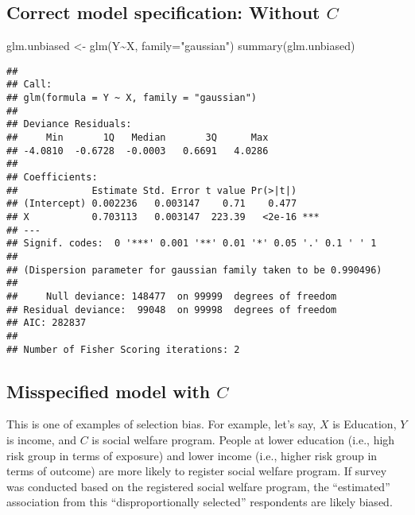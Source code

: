 \documentclass[
]{book}
\newenvironment{Shaded}{\begin{snugshade}}{\end{snugshade}}
\newcommand{\AttributeTok}[1]{\textcolor[rgb]{0.77,0.63,0.00}{#1}}
\newcommand{\FunctionTok}[1]{\textcolor[rgb]{0.00,0.00,0.00}{#1}}
\newcommand{\NormalTok}[1]{#1}
\newcommand{\OtherTok}[1]{\textcolor[rgb]{0.56,0.35,0.01}{#1}}
\newcommand{\SpecialCharTok}[1]{\textcolor[rgb]{0.00,0.00,0.00}{#1}}
\newcommand{\StringTok}[1]{\textcolor[rgb]{0.31,0.60,0.02}{#1}}
\begin{document}
\hypertarget{correct-model-specification-without-c-1}{%
\subsection{\texorpdfstring{Correct model specification: Without \(C\)}{Correct model specification: Without C}}\label{correct-model-specification-without-c-1}}

\begin{Shaded}
\begin{Highlighting}[]
\NormalTok{glm.unbiased }\OtherTok{\textless{}{-}} \FunctionTok{glm}\NormalTok{(Y}\SpecialCharTok{\textasciitilde{}}\NormalTok{X, }\AttributeTok{family=}\StringTok{"gaussian"}\NormalTok{)}
\FunctionTok{summary}\NormalTok{(glm.unbiased)}
\end{Highlighting}
\end{Shaded}

\begin{verbatim}
## 
## Call:
## glm(formula = Y ~ X, family = "gaussian")
## 
## Deviance Residuals: 
##     Min       1Q   Median       3Q      Max  
## -4.0810  -0.6728  -0.0003   0.6691   4.0286  
## 
## Coefficients:
##             Estimate Std. Error t value Pr(>|t|)    
## (Intercept) 0.002236   0.003147    0.71    0.477    
## X           0.703113   0.003147  223.39   <2e-16 ***
## ---
## Signif. codes:  0 '***' 0.001 '**' 0.01 '*' 0.05 '.' 0.1 ' ' 1
## 
## (Dispersion parameter for gaussian family taken to be 0.990496)
## 
##     Null deviance: 148477  on 99999  degrees of freedom
## Residual deviance:  99048  on 99998  degrees of freedom
## AIC: 282837
## 
## Number of Fisher Scoring iterations: 2
\end{verbatim}

\hypertarget{misspecified-model-with-c-1}{%
\subsection{\texorpdfstring{Misspecified model with \(C\)}{Misspecified model with C}}\label{misspecified-model-with-c-1}}

This is one of examples of selection bias. For example, let's say, \(X\) is Education, \(Y\) is income, and \(C\) is social welfare program. People at lower education (i.e., high risk group in terms of exposure) and lower income (i.e., higher risk group in terms of outcome) are more likely to register social welfare program. If survey was conducted based on the registered social welfare program, the ``estimated'' association from this ``disproportionally selected'' respondents are likely biased.
\end{document}

